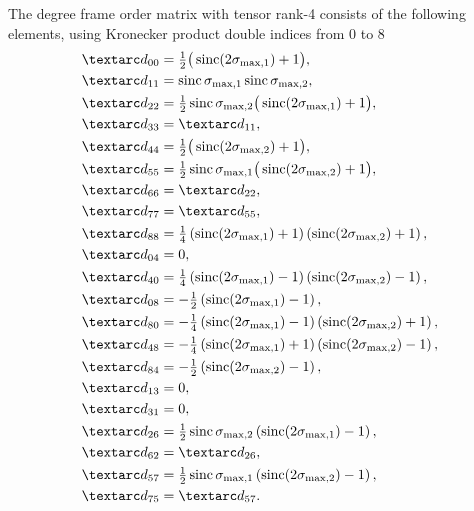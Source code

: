 The  degree frame order matrix with tensor rank-4 consists of the following elements, using Kronecker product double indices from 0 to 8
\begin{subequations} \label{eq: double rotor 2nd degree frame order matrix}
\begin{align}
    &\FO_{00} = \half \big( \sinc(2\conesmaxone) + 1 \big) , \\
    &\FO_{11} = \sinc\conesmaxone\sinc\conesmaxtwo , \\
    &\FO_{22} = \half\sinc\conesmaxtwo \big( \sinc(2\conesmaxone) + 1 \big) , \\
    &\FO_{33} = \FO_{11} , \\
    &\FO_{44} = \half \big( \sinc(2\conesmaxtwo) + 1 \big) , \\
    &\FO_{55} = \half\sinc\conesmaxone \big( \sinc(2\conesmaxtwo) + 1 \big) , \\
    &\FO_{66} = \FO_{22} , \\
    &\FO_{77} = \FO_{55} , \\
    &\FO_{88} = \quart \left( \sinc(2\conesmaxone) + 1 \right) \left( \sinc(2\conesmaxtwo) + 1 \right) , \\
    &\FO_{04} = 0 , \\
    &\FO_{40} = \quart \left( \sinc(2\conesmaxone) - 1 \right) \left( \sinc(2\conesmaxtwo) - 1 \right) , \\
    &\FO_{08} = -\half \left( \sinc(2\conesmaxone) - 1 \right) , \\
    &\FO_{80} = -\quart \left( \sinc(2\conesmaxone) - 1 \right) \left( \sinc(2\conesmaxtwo) + 1 \right) , \\
    &\FO_{48} = -\quart \left( \sinc(2\conesmaxone) + 1 \right) \left( \sinc(2\conesmaxtwo) - 1 \right) , \\
    &\FO_{84} = -\half \left( \sinc(2\conesmaxtwo) - 1 \right) , \\
    &\FO_{13} = 0 , \\
    &\FO_{31} = 0 , \\
    &\FO_{26} = \half \sinc\conesmaxtwo \left( \sinc(2\conesmaxone) - 1 \right) , \\
    &\FO_{62} = \FO_{26} , \\
    &\FO_{57} = \half \sinc\conesmaxone \left( \sinc(2\conesmaxtwo) - 1 \right) , \\
    &\FO_{75} = \FO_{57} .
\end{align}
\end{subequations}




